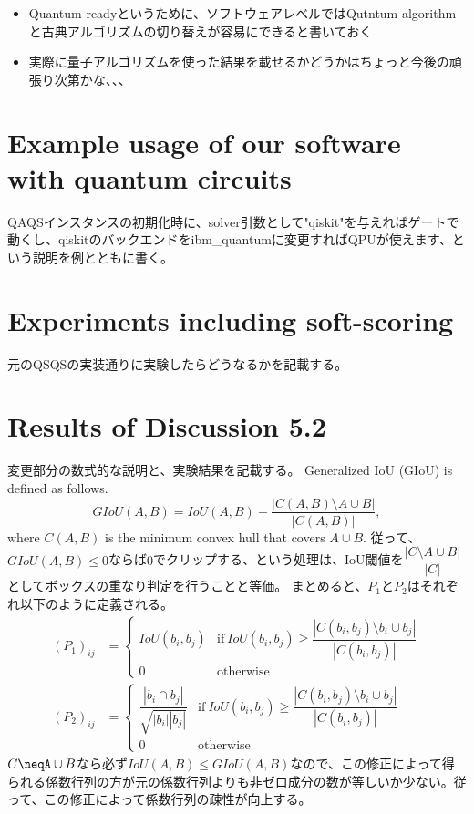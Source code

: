 \begin{itemize}
    \item Quantum-readyというために、ソフトウェアレベルではQutntum algorithmと古典アルゴリズムの切り替えが容易にできると書いておく
    \item 実際に量子アルゴリズムを使った結果を載せるかどうかはちょっと今後の頑張り次第かな、、、
\end{itemize}

\section{Example usage of our software with quantum circuits}
\label{appendix:software}
QAQSインスタンスの初期化時に、solver引数として"qiskit"を与えればゲートで動くし、qiskitのバックエンドをibm\_quantumに変更すればQPUが使えます、という説明を例とともに書く。

\section{Experiments including soft-scoring}
\label{appendix:exp_original_impl}
元のQSQSの実装通りに実験したらどうなるかを記載する。

\section{Results of Discussion 5.2}
\label{appendix:discussion}
変更部分の数式的な説明と、実験結果を記載する。
Generalized IoU (GIoU) is defined as follows.
\begin{equation}
    GIoU(A, B) = IoU(A, B) - \frac{|C(A, B)\setminus A\cup B|}{|C(A, B)|},
\end{equation}
where $C(A, B)$ is the minimum convex hull that covers $A\cup B$.
従って、$GIoU(A, B)\leq 0$ならば$0$でクリップする、という処理は、IoU閾値を$\dfrac{|C\setminus A\cup B|}{|C|}$としてボックスの重なり判定を行うことと等価。
まとめると、$P_1$と$P_2$はそれぞれ以下のように定義される。
\begin{align}
    (P_1)_{ij} &= \left\{
        \begin{array}{cl}
            IoU(b_i, b_j) & \mathrm{if}~IoU(b_i, b_j) \geq \dfrac{|C(b_i, b_j)\setminus b_i\cup b_j|}{|C(b_i, b_j)|}\\
            0 & \mathrm{otherwise}
        \end{array}\right.\\
    (P_2)_{ij} &= \left\{
        \begin{array}{cl}
            \dfrac{|b_i\cap b_j|}{\sqrt{|b_i||b_j|}} & \mathrm{if}~IoU(b_i, b_j) \geq \dfrac{|C(b_i, b_j)\setminus b_i\cup b_j|}{|C(b_i, b_j)|}\\
            0 & \mathrm{otherwise}
        \end{array}\right.
\end{align}
$C\neqA\cup B$なら必ず$IoU(A, B)\leq GIoU(A, B)$なので、この修正によって得られる係数行列の方が元の係数行列よりも非ゼロ成分の数が等しいか少ない。従って、この修正によって係数行列の疎性が向上する。

